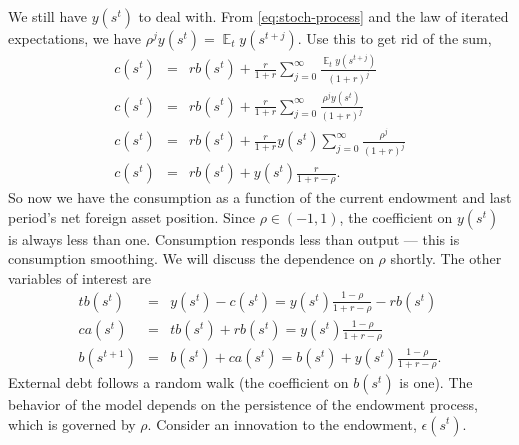 \documentclass[11pt,pdftex,twoside,letterpaper]{exam}
\DeclareMathOperator{\EX}{\mathbb{E}}%
\begin{document}
We still have $y(s^t)$ to deal with. From \eqref{eq:stoch-process} and the law of iterated expectations, we have $\rho^jy(s^t)=\EX_{t}y(s^{t+j})$. Use this to get rid of the sum,
\begin{eqnarray}
    c(s^t)&=&rb(s^{t}) + \frac{r}{1+r}\sum_{j=0}^\infty\frac{\EX_ty(s^{t+j})}{(1+r)^{j}}\\
   c(s^t)&=&rb(s^{t}) + \frac{r}{1+r}\sum_{j=0}^\infty\frac{\rho^jy(s^{t})}{(1+r)^{j}}\\
   c(s^t)&=&rb(s^{t}) + \frac{r}{1+r}y(s^{t})\sum_{j=0}^\infty\frac{\rho^j}{(1+r)^{j}}\\
   c(s^t)&=&rb(s^{t}) + y(s^{t}) \frac{r}{1+r-\rho}.
\end{eqnarray}
So now we have the consumption as a function of the current endowment and last period's net foreign asset position. Since $\rho\in(-1,1)$, the coefficient on $y(s^t)$ is always less than one. Consumption responds less than output --- this is consumption smoothing. We will discuss the dependence on $\rho$ shortly. The other variables of interest are
\begin{eqnarray}
  tb(s^t) &=& y(s^t)-c(s^t) =  y(s^{t}) \frac{1-\rho}{1+r-\rho}-rb(s^{t})\\
  ca(s^t) &=& tb(s^t)+rb(s^t) = y(s^{t}) \frac{1-\rho}{1+r-\rho} \label{eq:ca-stationary}\\
  b(s^{t+1}) &=& b(s^t) + ca(s^t) = b(s^t) + y(s^{t}) \frac{1-\rho}{1+r-\rho}.
\end{eqnarray}
External debt follows a random walk (the coefficient on $b(s^t)$ is one). The behavior of the model depends on the persistence of the endowment process, which is governed by $\rho$. Consider an innovation to the endowment, $\epsilon(s^t)$.
\end{document}
